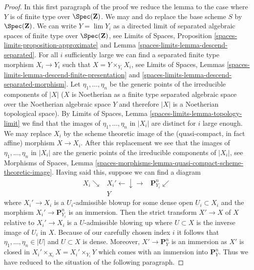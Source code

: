 \begin{proof}
In this first paragraph of the proof we reduce the lemma to the case
where $Y$ is of finite type over $\Spec(\mathbf{Z})$.
We may and do replace the base scheme $S$ by $\Spec(\mathbf{Z})$.
We can write $Y = \lim Y_i$ as a directed limit of separated
algebraic spaces of finite type over $\Spec(\mathbf{Z})$, see
Limits of Spaces, Proposition \ref{spaces-limits-proposition-approximate} and
Lemma \ref{spaces-limits-lemma-descend-separated}.
For all $i$ sufficiently large we can find a separated finite type morphism
$X_i \to Y_i$ such that $X = Y \times_{Y_i} X_i$, see
Limits of Spaces, Lemmas
\ref{spaces-limits-lemma-descend-finite-presentation} and
\ref{spaces-limits-lemma-descend-separated-morphism}.
Let $\eta_1, \ldots, \eta_n$ be the generic points of the irreducible
components of $|X|$ ($X$ is Noetherian as a finite type separated
algebraic space over the Noetherian algebraic space $Y$ and therefore
$|X|$ is a Noetherian topological space).
By Limits of Spaces, Lemma \ref{spaces-limits-lemma-topology-limit}
we find that the images of $\eta_1, \ldots, \eta_n$ in $|X_i|$
are distinct for $i$ large enough. We may replace
$X_i$ by the scheme theoretic image of the (quasi-compact, in fact affine)
morphism $X \to X_i$.
After this replacement we see that the images
of $\eta_1, \ldots, \eta_n$ in $|X_i|$ are the generic points of the
irreducible components of $|X_i|$, see
Morphisms of Spaces, Lemma
\ref{spaces-morphisms-lemma-quasi-compact-scheme-theoretic-image}.
Having said this, suppose we can find a diagram
$$
\begin{array}{ccc}X_i \searrow & X_i' \longleftarrow\downarrow\longrightarrow & \mathbf{P}^n_{Y_i} \swarrow \\  & Y & \end{array}
$$
where $X_i' \to X_i$ is a $U_i$-admissible blowup for some dense open
$U_i \subset X_i$ and the morphism $X_i' \to \mathbf{P}^n_{Y_i}$
is an immersion. Then the strict transform $X' \to X$ of $X$ relative
to $X_i' \to X_i$ is a $U$-admissible blowing up where $U \subset X$
is the inverse image of $U_i$ in $X$. Because of our carefully chosen
index $i$ it follows that $\eta_1, \ldots, \eta_n \in |U|$ and
$U \subset X$ is dense. Moreover, $X' \to \mathbf{P}^n_Y$ is an
immersion as $X'$ is closed in
$X_i' \times_{X_i} X = X_i' \times_{Y_i} Y$
which comes with an immersion into $\mathbf{P}^n_Y$. Thus we have reduced
to the situation of the following paragraph.


\end{proof}

